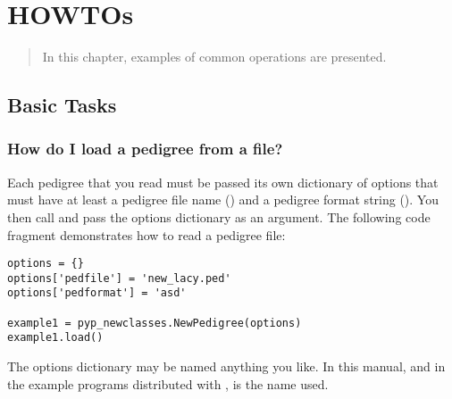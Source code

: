 \chapter{HOWTOs}
\label{cha:howtos}
\begin{quote}
In this chapter, examples of common operations are presented.
\end{quote}
\section{Basic Tasks}
\label{sec:howto-basic-operations}
\subsection{How do I load a pedigree from a file?}
\label{sec:howto-load-pedigree}
Each pedigree that you read must be passed its own dictionary of options that must have at least a pedigree file name () and a pedigree format string ().  You then call  and pass the options dictionary as an argument.  The following code fragment demonstrates how to read a pedigree file:
\begin{verbatim}
options = {}
options['pedfile'] = 'new_lacy.ped'
options['pedformat'] = 'asd'

example1 = pyp_newclasses.NewPedigree(options)
example1.load()
\end{verbatim}
The options dictionary may be named anything you like.  In this manual, and in the example programs distributed with \PyPedal{},  is the name used.
